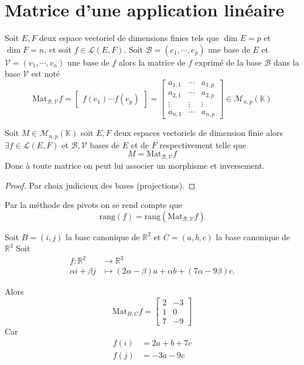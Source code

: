 \documentclass[11pt,colorlinks]{book}
\theoremstyle{mytheoremstyle}
\theoremstyle{mytheoremstyle}
\theoremstyle{mytheoremstyle}
\theoremstyle{mytheoremstyle}
\theoremstyle{mytheoremstyle}
\theoremstyle{mytheoremstyle}
\theoremstyle{mytheoremstyle}
\theoremstyle{mytheoremstyle}
\theoremstyle{myproblemstyle}
\def\mbb#1{\mathbb{#1}}
\def\mfc#1{\mathcal{#1}}
\def\bR{\mbb{R}}
\def\bK{\mbb{K}}
\def\ev{espace vectoriel }
\def\mor{\mfc{L}(E,F)}
\newcommand{\vfunc}[5]{
  \begin{align*}
    #1 \colon #2 &\to #3\\
    #4 &\mapsto #5.
  \end{align*}
}
\begin{document}
\section{Matrice d'une application linéaire}
\begin{definition}
  Soit $E,F$ deux \ev de dimensions finies tels que $\dim E = p$ et $\dim F = n$, et soit $f \in \mor$.
  Soit $\mfc{B} = (e_1,\cdots,e_p)$ une base de $E$ et $\mfc{V} = (v_1,\cdots,v_n)$ une base de $f$ 
  alors la matrice de $f$ exprimé de la base $\mfc{B}$ dans la base $\mfc{V}$ est noté
  \begin{equation*}
    \text{Mat}_{\mfc{B},\mfc{V}} f = \begin{bmatrix}
      f(e_1) \cdots f(e_p)
    \end{bmatrix} = \begin{bmatrix}
      a_{1,1} & \cdots & a_{1,p} \\
      a_{2,1} & \cdots & a_{2,p} \\ 
      \vdots & \vdots & \vdots \\ 
      a_{n,1} & \cdots & a_{n,p}
    \end{bmatrix} \in \mfc{M}_{n,p}(\bK)
  \end{equation*}
\end{definition}
\begin{theorem}
  Soit $M \in \mfc{M}_{n,p}(\bK)$ soit $E,F$ deux espaces vectoriels de dimension finie alors $\exists f \in \mfc{L}(E,F)$
  et $\mfc{B},\mfc{V}$ bases de $E$ et de $F$ respectivement
  telle que 
  \begin{equation*}
    M = \text{Mat}_{\mfc{B},\mfc{V}} f
  \end{equation*}
  Donc à toute matrice on peut lui associer un morphisme et inversement.
  \begin{proof}
    Par choix judicieux des bases (projections).
  \end{proof}
\end{theorem}
\begin{rmq}
  Par la méthode des pivots on se rend compte que 
  \begin{equation*}
    \text{rang}(f) = \text{rang}\left(\text{Mat}_{\mfc{B},\mfc{V}} f\right)
  \end{equation*}
\end{rmq}
\begin{ex}
  Soit $B = (i,j)$ la base canonique de $\bR^2$ et $C = (a,b,c)$ la base canonique de $\bR^3$
  Soit \vfunc{f}{\bR^2}{\bR^3}{\alpha i+ \beta j}{(2\alpha - \beta)a + \alpha b + (7\alpha - 9\beta)c}
  Alors 
  \begin{equation*}
    \text{Mat}_{B,C} f = \begin{bmatrix}
      2 & -3 \\ 
      1 & 0 \\ 
      7 & -9
    \end{bmatrix}
  \end{equation*}
  Car 
  \begin{align*}
    f(i) &= 2a + b + 7c \\ 
    f(j) &= -3a -9c
  \end{align*}
\end{ex}
\end{document}
